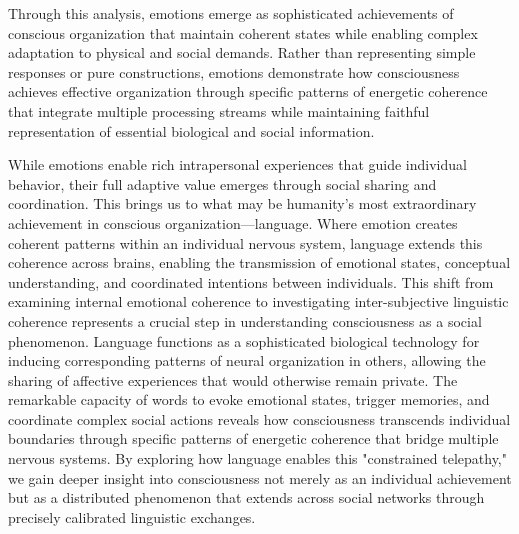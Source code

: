 Through this analysis, emotions emerge as sophisticated achievements of conscious organization that maintain coherent states while enabling complex adaptation to physical and social demands. Rather than representing simple responses or pure constructions, emotions demonstrate how consciousness achieves effective organization through specific patterns of energetic coherence that integrate multiple processing streams while maintaining faithful representation of essential biological and social information.

While emotions enable rich intrapersonal experiences that guide individual behavior, their full adaptive value emerges through social sharing and coordination. This brings us to what may be humanity's most extraordinary achievement in conscious organization—language. Where emotion creates coherent patterns within an individual nervous system, language extends this coherence across brains, enabling the transmission of emotional states, conceptual understanding, and coordinated intentions between individuals. This shift from examining internal emotional coherence to investigating inter-subjective linguistic coherence represents a crucial step in understanding consciousness as a social phenomenon. Language functions as a sophisticated biological technology for inducing corresponding patterns of neural organization in others, allowing the sharing of affective experiences that would otherwise remain private. The remarkable capacity of words to evoke emotional states, trigger memories, and coordinate complex social actions reveals how consciousness transcends individual boundaries through specific patterns of energetic coherence that bridge multiple nervous systems. By exploring how language enables this "constrained telepathy," we gain deeper insight into consciousness not merely as an individual achievement but as a distributed phenomenon that extends across social networks through precisely calibrated linguistic exchanges.

